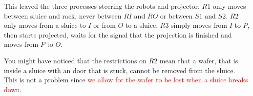 This leaved the three processes steering the robots and projector. $R1$ only moves between sluice and rack, never between $RI$ and $RO$ or between $S1$ and $S2$. $R2$ only moves from a sluice to $I$ or from $O$ to a sluice. $R3$ simply moves from $I$ to $P$, then starts projected, waits for the signal that the projection is finished and moves from $P$ to $O$.

You might have noticed that the restrictions on $R2$ mean that a wafer, that is inside a sluice with an door that is stuck, cannot be removed from the sluice. This is not a problem since \textcolor{red}{we allow for the wafer to be lost when a sluice breaks down}.